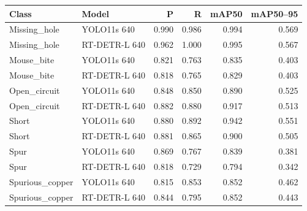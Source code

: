 \begin{tabular}{llrrrr}
\hline
Class & Model & P & R & mAP50 & mAP50--95 \\
\hline
Missing\_hole & YOLO11s 640 & 0.990 & 0.986 & 0.994 & 0.569 \\
Missing\_hole & RT-DETR-L 640 & 0.962 & 1.000 & 0.995 & 0.567 \\
Mouse\_bite & YOLO11s 640 & 0.821 & 0.763 & 0.835 & 0.403 \\
Mouse\_bite & RT-DETR-L 640 & 0.818 & 0.765 & 0.829 & 0.403 \\
Open\_circuit & YOLO11s 640 & 0.848 & 0.850 & 0.890 & 0.525 \\
Open\_circuit & RT-DETR-L 640 & 0.882 & 0.880 & 0.917 & 0.513 \\
Short & YOLO11s 640 & 0.880 & 0.892 & 0.942 & 0.551 \\
Short & RT-DETR-L 640 & 0.881 & 0.865 & 0.900 & 0.505 \\
Spur & YOLO11s 640 & 0.869 & 0.767 & 0.839 & 0.381 \\
Spur & RT-DETR-L 640 & 0.818 & 0.729 & 0.794 & 0.342 \\
Spurious\_copper & YOLO11s 640 & 0.815 & 0.853 & 0.852 & 0.462 \\
Spurious\_copper & RT-DETR-L 640 & 0.844 & 0.795 & 0.852 & 0.443 \\
\hline
\end{tabular}

